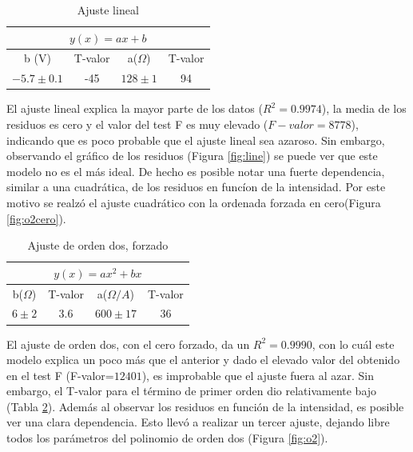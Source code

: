 \documentclass[twoside,twocolumn,a4paper]{article}
\begin{document}
\begin{table}[h]
\centering
\caption{Ajuste lineal}
\label{tab:line}
\begin{tabular}{|c|c|c|c|}
\hline
\multicolumn{4}{|c|}{$y(x)=ax+b$}           \\ \hline
b (V)        & T-valor & a($\Omega$) & T-valor \\ \hline
$-5.7\pm0.1$ & -45     & $128\pm1$   & 94      \\ \hline
\end{tabular}
\end{table}

El ajuste lineal explica la mayor parte de los datos ($R^2=0.9974$), la media de los residuos es cero y el valor del test F es muy elevado ($F-valor=8778$), indicando que es poco probable que el ajuste lineal sea azaroso. Sin embargo, observando el gr\'afico de los residuos (Figura \ref{fig:line}) se puede ver que este modelo no es el m\'as ideal. De hecho es posible notar una fuerte dependencia, similar a una cuadr\'atica, de los residuos en func\'ion de la intensidad. Por este motivo se realz\'o el ajuste cuadr\'atico con la ordenada forzada en cero(Figura \ref{fig:o2cero}).\par

\begin{table}[h]
\centering
\caption{Ajuste de orden dos, forzado}
\label{tab:o20}
\begin{tabular}{|c|c|c|c|}
\hline
\multicolumn{4}{|c|}{$y(x)=ax^2+bx$}   \\ \hline
b($\Omega$)& T-valor & a($\Omega/A$) & T-valor \\ \hline
$6\pm2$	   & 3.6     & $600\pm17$    & 36     \\ \hline
\end{tabular}
\end{table}

El ajuste de orden dos, con el cero forzado, da un $R^2=0.9990$, con lo cu\'al este modelo explica un poco m\'as que el anterior y dado el elevado valor del obtenido en el test F (F-valor=$12401$), es improbable que el ajuste fuera al azar. Sin embargo, el T-valor para el t\'ermino de primer orden dio relativamente bajo (Tabla \ref{tab:o20}). Adem\'as al observar los residuos en funci\'on de la intensidad, es posible ver una clara dependencia. Esto llev\'o a realizar un tercer ajuste, dejando libre todos los par\'ametros del polinomio de orden dos (Figura \ref{fig:o2}).\par
\end{document}
